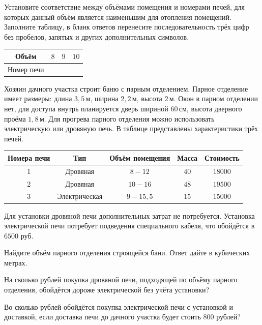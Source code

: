 \begin{class}[number=2]
	\begin{listofex}
		\item Установите соответствие между объёмами помещения и номерами печей, для которых данный объём является наименьшим для отопления помещений. Заполните таблицу, в бланк ответов перенесите последовательность трёх цифр без пробелов, запятых и других дополнительных символов.
		\begin{center}
			\footnotesize
			\begin{tabular}{|c|c|c|c|}
				\hline
				Объём&\( 8 \)&\( 9 \)&\( 10 \)\\
				\hline
				Номер печи&\(  \)&\(  \)&\(  \)\\
				\hline
			\end{tabular}
		\end{center}
		Хозяин дачного участка строит баню с парным отделением. Парное отделение имеет размеры: длина \( 3,5 \) м, ширина \( 2,2 \) м, высота \( 2 \) м. Окон в парном отделении нет, для доступа внутрь планируется дверь шириной \( 60 \) см, высота дверного проёма \( 1,8 \) м. Для прогрева парного отделения можно использовать электрическую или дровяную печь. В таблице представлены характеристики трёх печей.
		\begin{center}
			\footnotesize
			\begin{tabular}{|c|c|c|c|c|}
				\hline
				\rowcolor{gray}\textbf{Номера печи}&\textbf{Тип}&\textbf{Объём помещения}&\textbf{Масса}&\textbf{Стоимость}\\
				\hline
				1&Дровяная&\( 8-12 \)&\( 40 \)&\( 18 000 \)\\
				\hline
				2&Дровяная&\( 10-16 \)&\( 48 \)&\( 19 500 \)\\
				\hline
				3&Электрическая&\( 9-15,5 \)&\( 15 \)&\( 15 000 \)\\
				\hline
			\end{tabular}
		\end{center}
		Для установки дровяной печи дополнительных затрат не потребуется. Установка электрической печи потребует подведения специального кабеля, что обойдётся в \( 6500 \) руб.
		\item Найдите объём парного отделения строящейся бани. Ответ дайте в кубических метрах.
		\item На сколько рублей покупка дровяной печи, подходящей по объёму парного отделения, обойдётся дороже электрической без учёта установки?
		\item Во сколько рублей обойдётся покупка электрической печи с установкой и доставкой, если доставка печи до дачного участка будет стоить \( 800 \) рублей?

\end{listofex}
\end{class}
